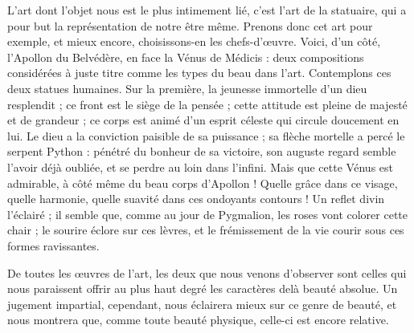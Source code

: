 \documentclass[a4paper, 11pt, oneside, landscape]{article}
\begin{document}
L'art dont l'objet nous est le plus intimement lié, c'est l'art de la statuaire, qui a pour but la représentation de notre être même. Prenons donc cet art pour exemple, et mieux encore, choisissons-en les chefs-d'œuvre. Voici, d'un côté, l'Apollon du Belvédère, en face la Vénus de Médicis : deux compositions considérées à juste titre comme les types du beau dans l'art. Contemplons ces deux statues humaines. Sur la première, la jeunesse immortelle d'un dieu resplendit ; ce front est le siège de la pensée ; cette attitude est pleine de majesté et de grandeur ; ce corps est animé d'un esprit céleste qui circule doucement en lui. Le dieu a la conviction paisible de sa puissance ; sa flèche mortelle a percé le serpent Python : pénétré du bonheur de sa victoire, son auguste regard semble l'avoir déjà oubliée, et se perdre au loin dans l'infini. Mais que cette Vénus est admirable, à côté même du beau corps d'Apollon ! Quelle grâce dans ce visage, quelle harmonie, quelle suavité dans ces ondoyants contours ! Un reflet divin l'éclairé ; il semble que, comme au jour de Pygmalion, les roses vont colorer cette chair ; le sourire éclore sur ces lèvres, et le frémissement de la vie courir sous ces formes ravissantes.

De toutes les œuvres de l'art, les deux que nous venons d'observer sont celles qui nous paraissent offrir au plus haut degré les caractères delà beauté absolue. Un jugement impartial, cependant, nous éclairera mieux sur ce genre de beauté, et nous montrera que, comme toute beauté physique, celle-ci est encore relative.
\end{document}
